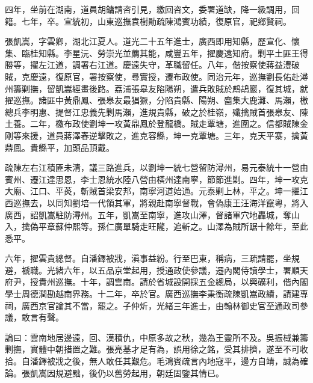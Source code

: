 \begin{pinyinscope}
四年，坐前在湖南，道員胡鏞請咨引見，繳回咨文，委署道缺，降一級調用，回籍。七年，卒。宣統初，山東巡撫袁樹勛疏陳鴻賓功績，復原官，祀鄉賢祠。

張凱嵩，字雲卿，湖北江夏人。道光二十五年進士，廣西即用知縣，歷宣化、懷集、臨桂知縣。李星沅、勞崇光並薦其能，咸豐五年，擢慶遠知府。剿平土匪王得勝等，擢左江道，調署右江道。慶遠失守，革職留任。八年，偕按察使蔣益澧破賊，克慶遠，復原官，署按察使，尋實授，遷布政使。同治元年，巡撫劉長佑赴潯州籌剿撫，留凱嵩經畫後路。荔浦張皋友陷陽朔，遣兵敗賊於鷓鴣巖，復其城，就擢巡撫。諸匪中黃鼎鳳、張皋友最猖獗，分陷貴縣、陽朔、麕集大鹿灘、馬瀨，檄總兵李明惠、提督江忠義先剿馬瀨，進規貴縣，破之於桂嶺，殲擒賊首張皋友、陳土養。二年，檄布政使劉坤一攻黃鼎鳳於登龍橋。賊走覃塘，進圍之。信都賊陳金剛等來援，道員蔣澤春逆擊敗之，進克容縣，坤一克覃塘。三年，克天平寨，擒黃鼎鳳。貴縣平，加頭品頂戴。

疏陳左右江積匪未清，議三路進兵，以劉坤一統七營留防潯州，易元泰統十一營由賓州、遷江達思恩，李士恩統水陸八營由橫州達南寧，節節進剿。四年，坤一攻克大廟、江口、平菼，斬賊首梁安邦，南寧河道始通。元泰剿上林，平之。坤一擢江西巡撫去，以同知劉培一代領其軍，將親赴南寧督戰，會偽康王汪海洋竄粵，將入廣西，詔凱嵩駐防潯州。五年，凱嵩至南寧，進攻山澤，督諸軍穴地轟城，奪山入，擒偽平章蘇仲熙等。孫仁廣單騎走旺隴，追斬之。山澤為賊所踞十餘年，至此悉平。

六年，擢雲貴總督。自潘鐸被戕，滇事益紛。行至巴東，稱病，三疏請罷，坐規避，褫職。光緒六年，以五品京堂起用，授通政使參議，遷內閣侍讀學士，署順天府尹，授貴州巡撫。十年，調雲南。請於省城設開採五金總局，以興礦利，偕內閣學士周德潤勘越南界務。十二年，卒於官。廣西巡撫李秉衡疏陳凱嵩政績，請建專祠，廣西京官論其不當，罷之。子仲炘，光緒三年進士，由翰林御史官至通政司參議，敢言有聲。

論曰：雲南地居邊遠，回、漢積仇，中原多故之秋，幾為王靈所不及。吳振棫兼籌剿撫，實體中朝措置之難。張亮基才足有為，誤用徐之銘，受其排擠，遂至不可收拾。自潘鐸被戕之後，無人敢任其艱危。毛鴻賓疏言內地寇平，邊方自靖，誠為確論。張凱嵩因規避黜，後仍以舊勞起用，朝廷固鑒其情已。


\end{pinyinscope}